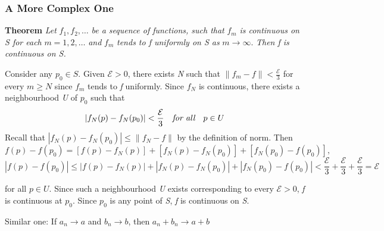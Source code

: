 \documentclass[titlepage,a4paper,12pt]{article}
\theoremstyle{nonumberplain}
\newtheorem{Proof}{\hskip 2em Proof}
\begin{document}
\subsubsection{A More Complex One} \textbf{Theorem} \emph{Let} $f_1,f_2,\dotsc$ \emph{be a sequence of functions, such that} $f_m$ \emph{is continuous on S for each } $m=1,2,\dotsc$ \emph{and} $f_m$ \emph{tends to f uniformly on S as} $m \rightarrow \infty$. \emph{Then f is continuous on S.}
\begin{Proof}
Consider any $p_0 \in S$. Given $\mathcal{E}>0$, there exists \emph{N} such that $\lVert f_m-f\rVert <\frac{\mathcal{E}}{3}$ for every $m\geq N$ since $f_m$ tends to \emph{f} uniformly. Since $f_N$ is continuous, there exists a neighbourhood \emph{U} of $p_0$ such that
$$|f_N(p)-f_N(p_0)| < \frac{\mathcal{E}}{3} \quad \emph{for all}\quad p\in U $$ 
Recall that $|f_N(p)-f_N(p_0)|\leq \lVert f_N -f\rVert$ by the definition of norm. Then
$$f(p)-f(p_0)=[f(p)-f_N(p)]+[f_N(p)-f_N(p_0)]+[f_N(p_0)-f(p_0)],$$
$$|f(p)-f(p_0)|\leq|f(p)-f_N(p)|+|f_N(p)-f_N(p_0)|+|f_N(p_0)-f(p_0)|<\frac{\mathcal{E}}{3}+\frac{\mathcal{E}}{3}+\frac{\mathcal{E}}{3}=\mathcal{E}$$

for all $p\in U$. Since such a neighbourhood \emph{U} exists corresponding to every $\mathcal{E}>0$, \emph{f} is continuous at $p_0$. Since $p_0$ is any point of \emph{S}, \emph{f} is continuous on \emph{S}.
\end{Proof}
Similar one: If $a_n\rightarrow a$ and 
$b_n\rightarrow b$, then $a_n+b_n\rightarrow a+b$
\end{document}
